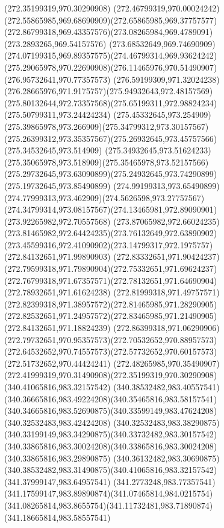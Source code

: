 {{\moveto(272.35199319,970.30290908)
\curveto(272.46799319,970.00024242)(272.55865985,969.68690909)(272.65865985,969.37757577)
\curveto(272.86799318,969.43357576)(273.08265984,969.4789091)(273.2893265,969.54157576)
\curveto(273.68532649,969.74690909)(274.07199315,969.89357575)(274.46799314,969.93624242)
\curveto(275.29065978,970.22690908)(276.11465976,970.51490907)(276.95732641,970.77357573)
\curveto(276.59199309,971.32024238)(276.28665976,971.9175757)(275.94932643,972.48157569)
\curveto(275.80132644,972.73357568)(275.65199311,972.98824234)(275.50799311,973.24424234)
\curveto(275.45332645,973.254909)(275.39865978,973.266909)(275.34799312,973.30157567)
\curveto(275.26399312,973.35357567)(275.26932645,973.45757566)(275.34532645,973.514909)
\curveto(275.34932645,973.51624233)(275.35065978,973.518909)(275.35465978,973.52157566)
\curveto(275.29732645,973.63090899)(275.24932645,973.74290899)(275.19732645,973.85490899)
\curveto(274.99199313,973.65490899)(274.77999313,973.462909)(274.5626598,973.27757567)
\curveto(274.34799314,973.08157567)(274.13465981,972.89090901)(273.92265982,972.70557568)
\curveto(273.87065982,972.66024235)(273.81465982,972.64424235)(273.76132649,972.63890902)
\curveto(273.45599316,972.41090902)(273.14799317,972.1975757)(272.84132651,971.99890903)
\curveto(272.83332651,971.90424237)(272.79599318,971.79890904)(272.75332651,971.69624237)
\curveto(272.76799318,971.67357571)(272.78132651,971.64690904)(272.78932651,971.61624238)
\curveto(272.81999318,971.49757571)(272.82399318,971.38957572)(272.81465985,971.28290905)
\curveto(272.82532651,971.24957572)(272.83465985,971.21490905)(272.84132651,971.18824239)
\curveto(272.86399318,971.06290906)(272.79732651,970.95357573)(272.70532652,970.88957573)
\curveto(272.64532652,970.74557573)(272.57732652,970.60157573)(272.51732652,970.44424241)
\curveto(272.48265985,970.35490907)(272.41999319,970.31490908)(272.35199319,970.30290908)
\moveto(340.41065816,983.32157542)
\curveto(340.38532482,983.40557541)(340.36665816,983.49224208)(340.35465816,983.58157541)
\curveto(340.34665816,983.52690875)(340.33599149,983.47624208)(340.32532483,983.42424208)
\curveto(340.32532483,983.38290875)(340.33199149,983.34290875)(340.33732482,983.30157542)
\curveto(340.33865816,983.30024208)(340.33865816,983.30024208)(340.33865816,983.29890875)
\curveto(340.36132482,983.30690875)(340.38532482,983.31490875)(340.41065816,983.32157542)
\moveto(341.37999147,983.64957541)
\curveto(341.2773248,983.77357541)(341.17599147,983.89890874)(341.07465814,984.0215754)
\curveto(341.08265814,983.8655754)(341.11732481,983.71890874)(341.18665814,983.58557541)
}}
